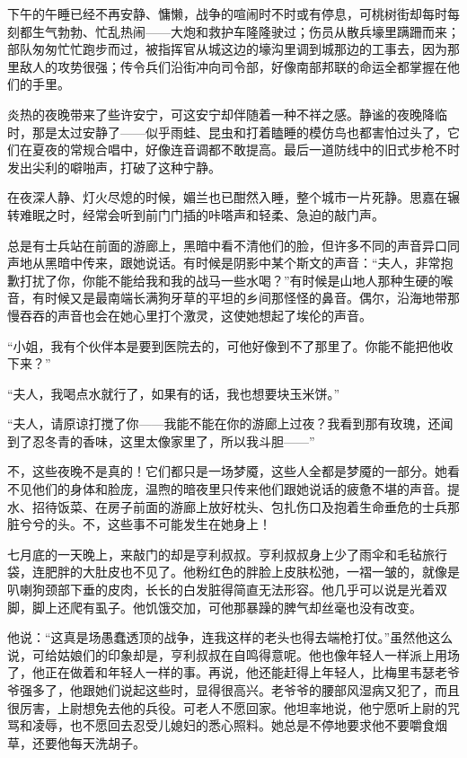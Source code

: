 \par 下午的午睡已经不再安静、慵懒，战争的喧闹时不时或有停息，可桃树街却每时每刻都生气勃勃、忙乱热闹——大炮和救护车隆隆驶过；伤员从散兵壕里蹒跚而来；部队匆匆忙忙跑步而过，被指挥官从城这边的壕沟里调到城那边的工事去，因为那里敌人的攻势很强；传令兵们沿街冲向司令部，好像南部邦联的命运全都掌握在他们的手里。
\par 炎热的夜晚带来了些许安宁，可这安宁却伴随着一种不祥之感。静谧的夜晚降临时，那是太过安静了——似乎雨蛙、昆虫和打着瞌睡的模仿鸟也都害怕过头了，它们在夏夜的常规合唱中，好像连音调都不敢提高。最后一道防线中的旧式步枪不时发出尖利的噼啪声，打破了这种宁静。
\par 在夜深人静、灯火尽熄的时候，媚兰也已酣然入睡，整个城市一片死静。思嘉在辗转难眠之时，经常会听到前门门插的咔嗒声和轻柔、急迫的敲门声。
\par 总是有士兵站在前面的游廊上，黑暗中看不清他们的脸，但许多不同的声音异口同声地从黑暗中传来，跟她说话。有时候是阴影中某个斯文的声音：“夫人，非常抱歉打扰了你，你能不能给我和我的战马一些水喝？”有时候是山地人那种生硬的喉音，有时候又是最南端长满狗牙草的平坦的乡间那怪怪的鼻音。偶尔，沿海地带那慢吞吞的声音也会在她心里打个激灵，这使她想起了埃伦的声音。
\par “小姐，我有个伙伴本是要到医院去的，可他好像到不了那里了。你能不能把他收下来？”
\par “夫人，我喝点水就行了，如果有的话，我也想要块玉米饼。”
\par “夫人，请原谅打搅了你——我能不能在你的游廊上过夜？我看到那有玫瑰，还闻到了忍冬青的香味，这里太像家里了，所以我斗胆——”
\par 不，这些夜晚不是真的！它们都只是一场梦魇，这些人全都是梦魇的一部分。她看不见他们的身体和脸庞，温煦的暗夜里只传来他们跟她说话的疲惫不堪的声音。提水、招待饭菜、在房子前面的游廊上放好枕头、包扎伤口及抱着生命垂危的士兵那脏兮兮的头。不，这些事不可能发生在她身上！
\par 七月底的一天晚上，来敲门的却是亨利叔叔。亨利叔叔身上少了雨伞和毛毡旅行袋，连肥胖的大肚皮也不见了。他粉红色的胖脸上皮肤松弛，一褶一皱的，就像是叭喇狗颈部下垂的皮肉，长长的白发脏得简直无法形容。他几乎可以说是光着双脚，脚上还爬有虱子。他饥饿交加，可他那暴躁的脾气却丝毫也没有改变。
\par 他说：“这真是场愚蠢透顶的战争，连我这样的老头也得去端枪打仗。”虽然他这么说，可给姑娘们的印象却是，亨利叔叔在自鸣得意呢。他也像年轻人一样派上用场了，他正在做着和年轻人一样的事。再说，他还能赶得上年轻人，比梅里韦瑟老爷爷强多了，他跟她们说起这些时，显得很高兴。老爷爷的腰部风湿病又犯了，而且很厉害，上尉想免去他的兵役。可老人不愿回家。他坦率地说，他宁愿听上尉的咒骂和凌辱，也不愿回去忍受儿媳妇的悉心照料。她总是不停地要求他不要嚼食烟草，还要他每天洗胡子。
